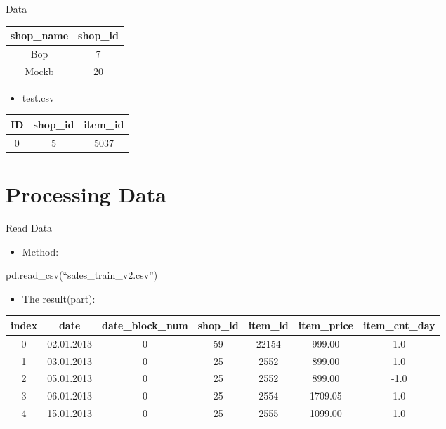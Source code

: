 \documentclass[
 size=12pt,
 paper=smartboard, %
 mode=present, %
 display=slides, %
style=tuliplab,
pauseslide,
fleqn,leqno]{powerdot}
\begin{document}
\begin{slide}{Data}
\begin{tabular}{|c|c|}
shop_name&shop_id\\%
 \hline
Bop&7\\
 \hline
Mockb&20\\
\end{tabular}


    \begin{itemize}
    \item test.csv
    \end{itemize}

     \begin{tabular}{|c|c|c|}%

ID&shop_id&item_id\\%
 \hline
0&5&5037  \\

\end{tabular}

\end{slide}

\section{Processing Data}

\begin{slide}{Read Data}
\begin{itemize}
\item Method:
\end{itemize}
pd.read_csv(“sales_train_v2.csv”)
\begin{itemize}
\item The result(part):
\end{itemize}
\begin{tabular}{|c|c|c|c|c|c|c|}%

index&date&date_block_num&shop_id&item_id&item_price&item_cnt_day\\%
 \hline
0&	02.01.2013	&0  &59 &22154  &999.00	 &1.0\\
 \hline
1&	03.01.2013	&0  &25	&2552   &899.00	 &1.0\\
 \hline
2&	05.01.2013	&0	&25	&2552   &899.00	 &-1.0\\
 \hline
3&	06.01.2013	&0	&25	&2554   &1709.05 &1.0\\
 \hline
4&	15.01.2013  &0	&25 &2555   &1099.00 &1.0

\end{tabular}
\end{slide}
\end{document}
